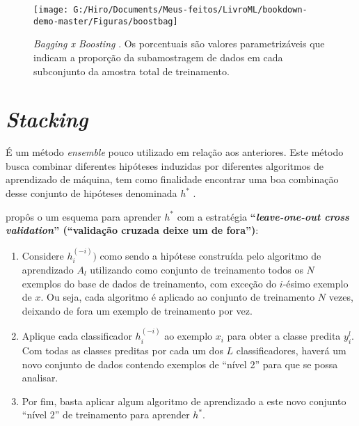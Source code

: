 \documentclass[
  openany]{book}
\begin{document}
\begin{figure}

{\centering \texttt{[image: G:/Hiro/Documents/Meus-feitos/LivroML/bookdown-demo-master/Figuras/boostbag]} 

}

\caption{\emph{Bagging x Boosting} \citep{mayrink2015avaliaccao}. Os porcentuais são valores parametrizáveis que indicam a proporção da subamostragem de dados em cada subconjunto da amostra total de treinamento.}\label{fig:boostbag}
\end{figure}



\hypertarget{stacking}{%
\section{\texorpdfstring{\emph{Stacking}}{Stacking}}\label{stacking}}

É um método \emph{ensemble} pouco utilizado em relação aos anteriores. Este método busca combinar diferentes hipóteses induzidas por diferentes algoritmos de aprendizado de máquina, tem como finalidade encontrar uma boa combinação desse conjunto de hipóteses denominada \(h^*\) \citep{bernardini2002combinaccao}.

\citet{wolpert1992stacked} propôs o um esquema para aprender \(h^*\) com a estratégia \textbf{``\emph{leave-one-out cross validation}'' (``validação cruzada deixe um de fora'')}:

\begin{enumerate}
\def\labelenumi{\arabic{enumi}.}
\item
  Considere \(h_i^{(-i)})\) como sendo a hipótese construída pelo algoritmo de aprendizado \(A_l\) utilizando como conjunto de treinamento todos os \(N\) exemplos do base de dados de treinamento, com exceção do \(i\)-ésimo exemplo de \(x\). Ou seja, cada algoritmo é aplicado ao conjunto de treinamento \(N\) vezes, deixando de fora um exemplo de treinamento por vez.
\item
  Aplique cada classificador \(h_i^{(-i)}\) ao exemplo \(x_i\) para obter a classe predita \(y_i^l\). Com todas as classes preditas por cada um dos \(L\) classificadores, haverá um novo conjunto de dados contendo exemplos de ``nível 2'' para que se possa analisar.
\item
  Por fim, basta aplicar algum algoritmo de aprendizado a este novo conjunto ``nível 2'' de treinamento para aprender \(h^*\).
\end{enumerate}
\end{document}
